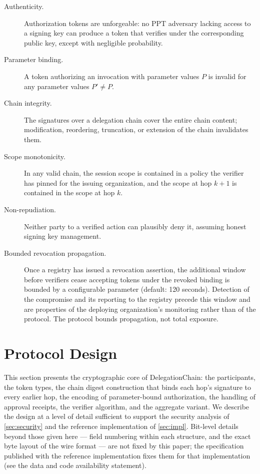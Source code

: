 \documentclass[11pt,a4paper]{article}
\begin{document}
\begin{description}
    \item[Authenticity.] Authorization tokens are unforgeable: no PPT
    adversary lacking access to a signing key can produce a token that
    verifies under the corresponding public key, except with negligible
    probability.
    \item[Parameter binding.] A token authorizing an invocation with
    parameter values $P$ is invalid for any parameter values $P' \neq P$.
    \item[Chain integrity.] The signatures over a delegation chain cover
    the entire chain content; modification, reordering, truncation, or
    extension of the chain invalidates them.
    \item[Scope monotonicity.] In any valid chain, the session scope is
    contained in a policy the verifier has pinned for the issuing
    organization, and the scope at hop $k+1$ is contained in the scope
    at hop $k$.
    \item[Non-repudiation.] Neither party to a verified action can
    plausibly deny it, assuming honest signing key management.
    \item[Bounded revocation propagation.] Once a registry has issued a
    revocation assertion, the additional window before verifiers cease
    accepting tokens under the revoked binding is bounded by a
    configurable parameter (default: 120 seconds). Detection of the
    compromise and its reporting to the registry precede this window and
    are properties of the deploying organization's monitoring rather
    than of the protocol. The protocol bounds propagation, not total
    exposure.
\end{description}

\section{Protocol Design}
\label{sec:protocol}

This section presents the cryptographic core of DelegationChain: the
participants, the token types, the chain digest construction that binds
each hop's signature to every earlier hop, the encoding of
parameter-bound authorization, the handling of approval receipts, the
verifier algorithm, and the aggregate variant. We describe the design at
a level of detail sufficient to support the security analysis of
\cref{sec:security} and the reference implementation of
\cref{sec:impl}. Bit-level details beyond those given here --- field
numbering within each structure, and the exact byte layout of the wire
format --- are not fixed by this paper; the specification published with
the reference implementation fixes them for that implementation
(see the data and code availability statement).
\end{document}
